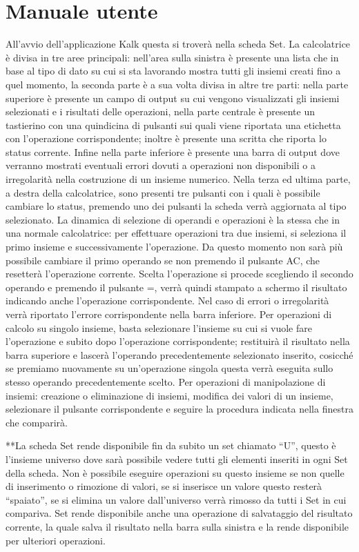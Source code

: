 \documentclass[a4paper,10pt]{article}
\begin{document}
        \section{Manuale utente}
        All’avvio dell’applicazione Kalk questa si troverà nella scheda Set. La calcolatrice è divisa in tre aree principali: nell’area sulla sinistra è presente una lista che in base al tipo di dato su cui si sta lavorando mostra tutti gli insiemi creati fino a quel momento, la seconda parte è a sua volta divisa in altre tre parti: nella parte superiore è presente un campo di output su cui vengono visualizzati gli insiemi selezionati e i risultati delle operazioni, nella parte centrale è presente un tastierino con una quindicina di pulsanti sui quali viene riportata una etichetta con l’operazione corrispondente; inoltre è presente una scritta che riporta lo status corrente. Infine nella parte inferiore è presente una barra di output dove verranno mostrati eventuali errori dovuti a operazioni non disponibili o a irregolarità nella costruzione di un insieme numerico.
        Nella terza ed ultima parte, a destra della calcolatrice, sono presenti tre pulsanti con i quali è possibile cambiare lo status, premendo uno dei pulsanti la scheda verrà aggiornata al tipo selezionato. La dinamica di selezione di operandi e operazioni è la stessa che in una normale calcolatrice: per effettuare operazioni tra due insiemi, si seleziona il primo insieme e successivamente l’operazione. Da questo momento non sarà più possibile cambiare il primo operando se non premendo il pulsante AC, che resetterà l’operazione corrente. Scelta l’operazione si procede scegliendo il secondo operando e premendo il pulsante =, verrà quindi stampato a schermo il risultato indicando anche l’operazione corrispondente. Nel caso di errori o irregolarità verrà riportato l’errore corrispondente nella barra inferiore.
        Per operazioni di calcolo su singolo insieme, basta selezionare l’insieme su cui si vuole fare l’operazione e subito dopo l’operazione corrispondente; restituirà il risultato nella barra superiore e lascerà l’operando precedentemente selezionato inserito, cosicché se premiamo nuovamente su un’operazione singola questa verrà eseguita sullo stesso operando precedentemente scelto.
        Per operazioni di manipolazione di insiemi: creazione o eliminazione di insiemi, modifica dei valori di un insieme, selezionare il pulsante corrispondente e seguire la procedura indicata nella finestra che comparirà.

        **La scheda Set rende disponibile fin da subito un set chiamato “U”, questo è l’insieme universo dove sarà possibile vedere tutti gli elementi inseriti in ogni Set della scheda. Non è possibile eseguire operazioni su questo insieme se non quelle di inserimento o rimozione di valori, se si inserisce un valore questo resterà “spaiato”, se si elimina un valore dall’universo verrà rimosso da tutti i Set in
        cui compariva.
        Set rende disponibile anche una operazione di salvataggio del risultato corrente, la quale salva il risultato
        nella barra sulla sinistra e la rende disponibile per ulteriori operazioni.
\end{document}
